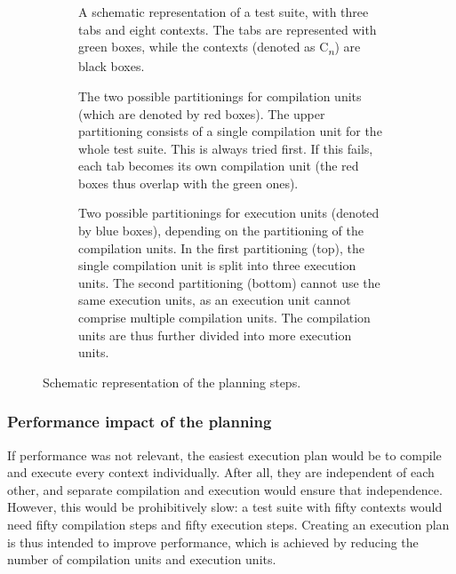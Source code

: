 \documentclass[../main]{subfiles}
\begin{document}
\begin{figure}
    \begin{subfigure}{\textwidth}
        \centering
        
        \caption{
            A schematic representation of a test suite, with three tabs and eight contexts.
            The tabs are represented with green boxes, while the contexts (denoted as C\textsubscript{$n$}) are black boxes.
        }
        \label{fig:planning-suite}
    \end{subfigure}
    \par\bigskip
    \begin{subfigure}{\textwidth}
        \centering
        
        \caption{
            The two possible partitionings for compilation units (which are denoted by red boxes).
            The upper partitioning consists of a single compilation unit for the whole test suite.
            This is always tried first.
            If this fails, each tab becomes its own compilation unit (the red boxes thus overlap with the green ones).
        }
        \label{fig:planning-compilation}
    \end{subfigure}
    \par\bigskip
    \begin{subfigure}{\textwidth}
        \centering
        
        \caption{
            Two possible partitionings for execution units (denoted by blue boxes), depending on the partitioning of the compilation units.
            In the first partitioning (top), the single compilation unit is split into three execution units.
            The second partitioning (bottom) cannot use the same execution units, as an execution unit cannot comprise multiple compilation units.
            The compilation units are thus further divided into more execution units.
        }
        \label{fig:planning-execution}
    \end{subfigure}
    \caption{Schematic representation of the planning steps.}
\end{figure}

\subsubsection{Performance impact of the planning}

If performance was not relevant, the easiest execution plan would be to compile and execute every context individually.
After all, they are independent of each other, and separate compilation and execution would ensure that independence.
However, this would be prohibitively slow: a test suite with fifty contexts would need fifty compilation steps and fifty execution steps.
Creating an execution plan is thus intended to improve performance, which is achieved by reducing the number of compilation units and execution units.
\end{document}
